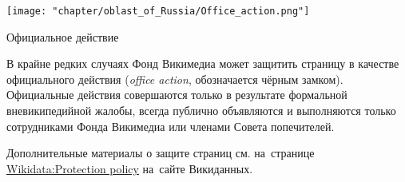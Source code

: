 \newpage
\begin{marginfigure}
\centering\texttt{[image: "chapter/oblast\_of\_Russia/Office\_action.png"]}
\caption [Иконка. Официальное действие.]{Официальное действие}%
\end{marginfigure}
%
В крайне редких случаях Фонд Викимедиа может защитить страницу в качестве официального действия (\textit{office action}, обозначается чёрным замком). Официальные действия совершаются только в результате формальной вневикипедийной жалобы, всегда публично объявляются и выполняются только сотрудниками Фонда Викимедиа или членами Совета попечителей.


Дополнительные материалы о защите страниц см. 
на~странице \href{https://www.wikidata.org/wiki/Wikidata:Protection_policy}{Wikidata:Protection policy} 
на~сайте Викиданных.
